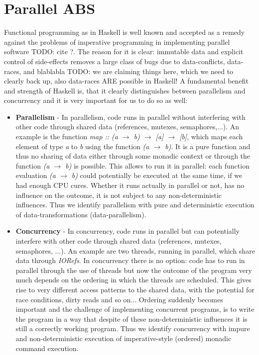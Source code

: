 \chapter{Parallel ABS}
\label{ch:parallel_abs}
Functional programming as in Haskell is well known and accepted as a remedy against the problems of imperative programming in implementing parallel software TODO: cite ?. The reason for it is clear: immutable data and explicit control of side-effects removes a large class of bugs due to data-conflicts, data-races, and blablabla TODO: we are claiming things here, which we need to clearly back up, also data-races ARE possible in Haskell! A fundamental benefit and strength of Haskell is, that it clearly distinguishes between parallelism and concurrency \cite{jones_tackling_2002} and it is very important for us to do so as well:

\begin{itemize}
	\item \textbf{Parallelism} - In parallelism, code runs in parallel without interfering with other code through shared data (references, mutexes, semaphores,...). An example is the function \textit{map :: (a $\rightarrow$ b) $\rightarrow$ [a] $\rightarrow$ [b]}, which maps each element of type \textit{a} to \textit{b} using the function \textit{(a $\rightarrow$ b)}. It is a pure function and thus no sharing of data either through some monadic context or through the function \textit{(a $\rightarrow$ b)} is possible. This allows to run it in parallel: each function evaluation \textit{(a $\rightarrow$ b)} could potentially be executed at the same time, if we had enough CPU cures. Whether it runs actually in parallel or not, has no influence on the outcome, it is not subject to any non-deterministic influences. Thus we identify parallelism with pure and deterministic execution of data-transformations (data-parallelism).
	
	\item \textbf{Concurrency} - In concurrency, code runs in parallel but can potentially interfere with other code through shared data (references, mutexes, semaphores, ...). An example are two threads, running in parallel, which share data through \textit{IORefs}. In concurrency there is no option: code has to run in parallel through the use of threads but now the outcome of the program very much depends on the ordering in which the threads are scheduled. This gives rise to very different access patterns to the shared data, with the potential for race conditions, dirty reads and so on... Ordering suddenly becomes important and the challenge of implementing concurrent programs, is to write the program in a way that despite of these non-deterministic influences it is still a correctly working program. Thus we identify concurrency with impure and non-deterministic execution of imperative-style (ordered) monadic command execution.
\end{itemize}

